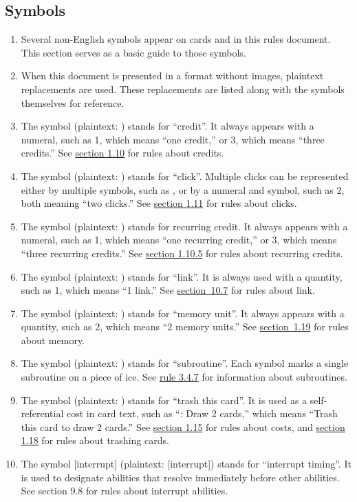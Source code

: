 \subsection{Symbols}
\begin{enumerate}
	\item Several non-English symbols appear on cards and in this rules document. This section serves as a basic guide to those symbols.
	\item When this document is presented in a format without images, plaintext replacements are used. These replacements are listed along with the symbols themselves for reference.
	\item The symbol \credit (plaintext: \credit) stands for ``credit''. It always appears with a numeral, such as 1\credit, which means ``one credit,'' or 3\credit, which means ``three credits.'' See \hyperlink{page.i}{section 1.10} for rules about credits.
	\item The symbol \click (plaintext: \click) stands for ``click''. Multiple clicks can be represented either by multiple symbols, such as \click\click, or by a numeral and symbol, such as 2\click, both meaning ``two clicks.'' See \hyperlink{page.i}{section 1.11} for rules about clicks.
	\item The symbol \recurring (plaintext: \recurring) stands for recurring credit. It always appears with a numeral, such as 1\recurring, which means ``one recurring credit,'' or 3\recurring, which means ``three recurring credits.'' See \hyperlink{page.i}{section 1.10.5} for rules about recurring credits.
	\item The symbol \link (plaintext: \link) stands for ``link''. It is always used with a quantity, such as 1\link, which means ``1 link.'' See \hyperlink{page.i}{section~10.7} for rules about link.
	\item The symbol \MU (plaintext: \MU) stands for ``memory unit''. It always appears with a quantity, such as 2\MU, which means ``2 memory units.'' See \hyperlink{page.i}{section~1.19} for rules about memory.
	\item The symbol \sub (plaintext: \sub) stands for ``subroutine''. Each symbol marks a single subroutine on a piece of ice. See \hyperlink{page.i}{rule 3.4.7} for information about subroutines.
	\item The symbol \trash (plaintext: \trash) stands for ``trash this card''. It is used as a self-referential cost in card text, such as ``\trash: Draw 2 cards,'' which means ``Trash this
	      card to draw 2 cards.'' See \hyperlink{page.i}{section 1.15} for rules about costs, and \hyperlink{page.i}{section 1.18} for rules about trashing cards.
	\item \textcolor{Bittersweet}{The symbol [interrupt] (plaintext: [interrupt]) stands for ``interrupt timing''. It is used to designate abilities that resolve immediately before other abilities. See section 9.8 for rules about interrupt abilities.}
\end{enumerate}
